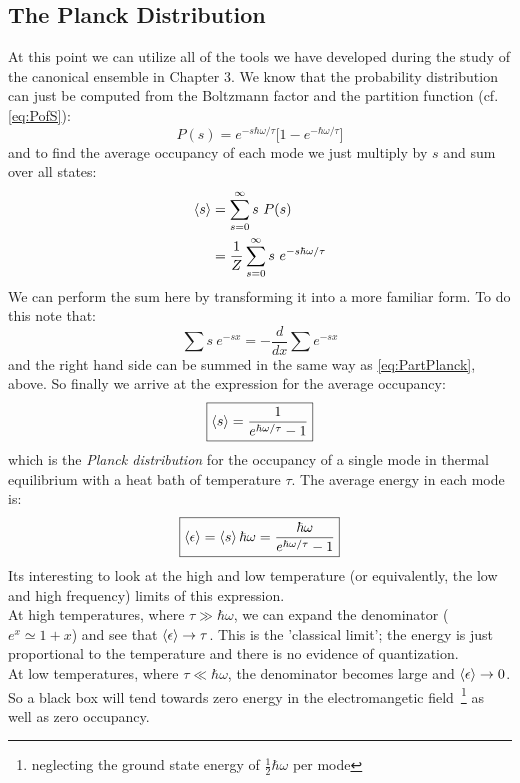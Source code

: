 \subsection{The Planck Distribution}
At this point we can utilize all of the tools we have developed during the study of the canonical ensemble in Chapter 3. We know that the probability 
distribution can just be computed from the Boltzmann factor and the partition 
function (cf.\,\cref{eq:PofS}):
\begin{equation}
P(s) = e^{-s \hbar \omega / \tau} \bigg[ 1 - e^{-\hbar \omega / \tau} \bigg]
\end{equation}
and to find the average occupancy of each mode we just multiply by $s$ and sum over all states:
\begin{align}
\Braket{s} &= \sum_{s=0}^{\infty} s~P(s) \\
           &= \frac{1}{Z} \sum_{s=0}^{\infty} s~e^{-s \hbar \omega / \tau}
\end{align}
We can perform the sum here by transforming it into a more familiar form. To do this note that:
\begin{equation}
\sum s~e^{-s x} = -\frac{d}{dx} \sum e^{-s x}
\end{equation}
and the right hand side can be summed in the same way as \cref{eq:PartPlanck}, above.
So finally we arrive at the expression for the average occupancy:
\begin{equation}
\boxed{\Braket{s} = \frac{1}{e^{\hbar \omega / \tau} - 1}}
\label{eq:PlanckOccupy}
\end{equation}
which is the \emph{Planck distribution} for the occupancy of a single mode in thermal equilibrium with a heat bath of temperature $\tau$. The average energy in each mode is:
\begin{equation}
\boxed{\Braket{\epsilon} = \Braket{s} \hbar \omega= 
\frac{\hbar \omega}{e^{\hbar \omega / \tau} - 1}}
\end{equation}
Its interesting to look at the high and low temperature (or equivalently, the low and high frequency) limits of this expression. \\

At high temperatures, where 
$\tau \gg \hbar \omega$, we can expand the denominator ($e^x \simeq 1 + x$) and see
that $\Braket{\epsilon} \to \tau$. This is the 'classical limit'; the energy is just
proportional to the temperature and there is no evidence of quantization.\\

At low temperatures, where $\tau \ll \hbar \omega$, the denominator becomes large
and $\Braket{\epsilon} \to 0$. So a black box will tend towards zero energy in the
electromangetic field~\footnote{neglecting the ground state energy of 
$\frac{1}{2}\hbar \omega$ per mode} as well as zero occupancy. \\

